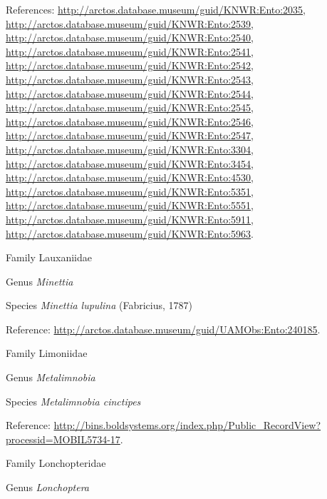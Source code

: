 \documentclass[9pt, article]{memoir}
\begin{document}
\begin{multicols}{2}
References: 
\url{http://arctos.database.museum/guid/KNWR:Ento:2035}, 
\url{http://arctos.database.museum/guid/KNWR:Ento:2539}, 
\url{http://arctos.database.museum/guid/KNWR:Ento:2540}, 
\url{http://arctos.database.museum/guid/KNWR:Ento:2541}, 
\url{http://arctos.database.museum/guid/KNWR:Ento:2542}, 
\url{http://arctos.database.museum/guid/KNWR:Ento:2543}, 
\url{http://arctos.database.museum/guid/KNWR:Ento:2544}, 
\url{http://arctos.database.museum/guid/KNWR:Ento:2545}, 
\url{http://arctos.database.museum/guid/KNWR:Ento:2546}, 
\url{http://arctos.database.museum/guid/KNWR:Ento:2547}, 
\url{http://arctos.database.museum/guid/KNWR:Ento:3304}, 
\url{http://arctos.database.museum/guid/KNWR:Ento:3454}, 
\url{http://arctos.database.museum/guid/KNWR:Ento:4530}, 
\url{http://arctos.database.museum/guid/KNWR:Ento:5351}, 
\url{http://arctos.database.museum/guid/KNWR:Ento:5551}, 
\url{http://arctos.database.museum/guid/KNWR:Ento:5911}, 
\url{http://arctos.database.museum/guid/KNWR:Ento:5963}.

\vspace{6pt}\noindent\hspace{24pt}Family Lauxaniidae


\vspace{6pt}\noindent\hspace{30pt}Genus \textit{Minettia}


\vspace{6pt}\noindent\hspace{36pt}Species \textit{Minettia lupulina} (Fabricius, 1787)


Reference: 
\url{http://arctos.database.museum/guid/UAMObs:Ento:240185}.

\vspace{6pt}\noindent\hspace{24pt}Family Limoniidae


\vspace{6pt}\noindent\hspace{30pt}Genus \textit{Metalimnobia}


\vspace{6pt}\noindent\hspace{36pt}Species \textit{Metalimnobia cinctipes}


Reference: 
\url{http://bins.boldsystems.org/index.php/Public_RecordView?processid=MOBIL5734-17}.

\vspace{6pt}\noindent\hspace{24pt}Family Lonchopteridae


\vspace{6pt}\noindent\hspace{30pt}Genus \textit{Lonchoptera}



\end{multicols}
\end{document}
